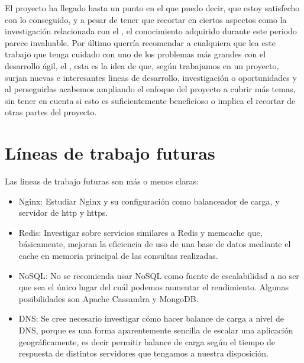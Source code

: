 El proyecto ha llegado hasta un punto en el que puedo decir, que estoy satisfecho con lo conseguido, y a pesar de tener que recortar en ciertos aspectos como la investigación relacionada con el , el conocimiento adquirido durante este periodo parece invaluable. Por último querría recomendar a cualquiera que lea este trabajo que tenga cuidado con uno de los problemas más grandes con el desarrollo ágil, el , esta es la idea de que, según trabajamos en un proyecto, surjan nuevas e interesantes lineas de desarrollo, investigación o oportunidades y al perseguirlas acabemos ampliando el enfoque del proyecto a cubrir más temas, sin tener en cuenta si esto es suficientemente beneficioso o implica el recortar de otras partes del proyecto.
 

\section{Líneas de trabajo futuras}
Las lineas de trabajo futuras son más o menos claras:

\begin{itemize}
\item Nginx: Estudiar Nginx y su configuración como balanceador de carga,  y servidor de http y https. 
\item Redis: Investigar sobre servicios similares a Redis y memcache que, básicamente, mejoran la eficiencia de uso de una base de datos mediante el cache en memoria principal de las consultas realizadas.
\item NoSQL: No se recomienda usar NoSQL como fuente de escalabilidad a no ser que sea el único lugar del cuál podemos aumentar el rendimiento. Algunas posibilidades son Apache Cassandra y MongoDB.
\item DNS: Se cree necesario investigar cómo hacer balance de carga a nivel de DNS, porque es una forma aparentemente sencilla de escalar una aplicación geográficamente, es decir permitir balance de carga según el tiempo de respuesta de distintos servidores que tengamos a nuestra disposición.
\end{itemize}

